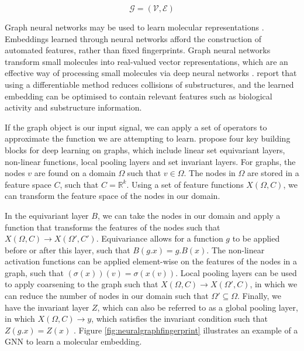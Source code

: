 \begin{equation}\label{eq_graph}
	\mathcal{G}=(\mathcal{V}, \mathcal{E})
\end{equation}

Graph neural networks may be used to learn molecular representations \cite{jiang2021could}. Embeddings learned through neural networks afford the construction of automated features, rather than fixed fingerprints. Graph neural networks transform small molecules into real-valued vector representations, which are an effective way of processing small molecules via deep neural networks \cite{gomez2018automatic}. \citet{duvenaud2015convolutional} report that using a differentiable method reduces collisions of substructures, and the learned embedding can be optimised to contain relevant features such as biological activity and substructure information.

If the graph object is our input signal, we can apply a set of operators to approximate the function we are attempting to learn. \citet{bronstein2021geometric} propose four key building blocks for deep learning on graphs, which include linear set equivariant layers, non-linear functions, local pooling layers and set invariant layers. For graphs, the nodes $v$ are found on a domain $\Omega$ such that $v \in \Omega$. The nodes in $\Omega$ are stored in a feature space $C$, such that $C = \mathbb{R}^k$. Using a set of feature functions $X(\Omega, C)$, we can transform the feature space of the nodes in our domain. 

In the equivariant layer $B$, we can take the nodes in our domain and apply a function that transforms the features of the nodes such that $X(\Omega, C) \rightarrow X(\Omega', C')$. Equivariance allows for a function $g$ to be applied before or after this layer, such that $B(g.x) = g.B(x)$. The non-linear activation functions can be applied element-wise on the features of the nodes in a graph, such that $(\sigma(x))(v) = \sigma(x(v))$. Local pooling layers can be used to apply coarsening to the graph such that $X(\Omega, C) \rightarrow X(\Omega', C)$, in which we can reduce the number of nodes in our domain such that $\Omega' \subseteq \Omega$. Finally, we have the invariant layer $Z$, which can also be referred to as a global pooling layer, in which $X(\Omega, C) \rightarrow y$, which satisfies the invariant condition such that $Z(g.x) = Z(x)$ \citep{bronstein2021geometric}. Figure \ref{fig:neuralgraphfingerprint} illustrates an example of a GNN to learn a molecular embedding.

